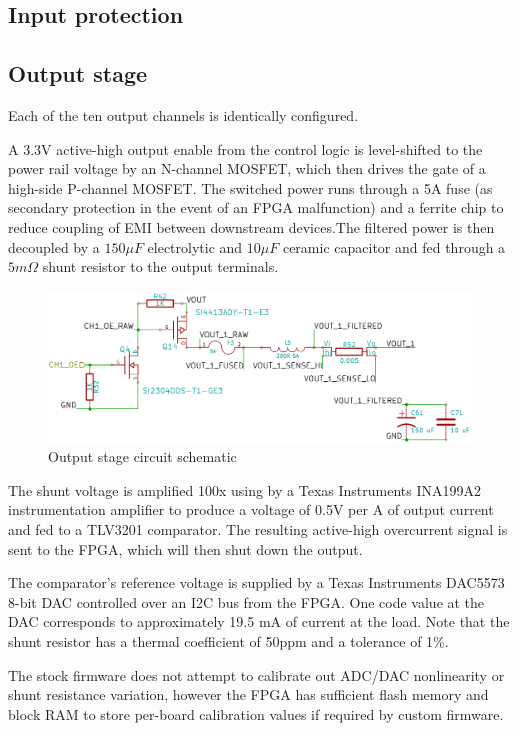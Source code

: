 \documentclass{article}
\begin{document}
\subsection{Input protection}

\subsection{Output stage}

Each of the ten output channels is identically configured.

A 3.3V active-high output enable from the control logic is level-shifted to the power rail voltage by an N-channel
MOSFET, which then drives the gate of a high-side P-channel MOSFET. The switched power runs through a 5A fuse (as 
secondary protection in the event of an FPGA malfunction) and a ferrite chip to reduce coupling of EMI between 
downstream devices.The filtered power is then decoupled by a $150 \mu F$ electrolytic and $10 \mu F$ ceramic 
capacitor and fed through a $5 m\Omega$ shunt resistor to the output terminals.

\begin{figure}[h!]
\includegraphics[scale=0.25]{output-stage-1.png}
\caption{Output stage circuit schematic}
\label{output-stage-1}
\end{figure}
\FloatBarrier

The shunt voltage is amplified 100x using by a Texas Instruments INA199A2 instrumentation amplifier to produce a 
voltage of 0.5V per A of output current and fed to a TLV3201 comparator. The resulting active-high overcurrent signal 
is sent to the FPGA, which will then shut down the output.

The comparator's reference voltage is supplied by a Texas Instruments DAC5573 8-bit DAC controlled over an I2C bus 
from the FPGA. One code value at the DAC corresponds to approximately 19.5 mA of current at the load. Note that the 
shunt resistor has a thermal coefficient of 50ppm and a tolerance of 1\%.

The stock firmware does not attempt to calibrate out ADC/DAC nonlinearity or shunt resistance variation, however the
FPGA has sufficient flash memory and block RAM to store per-board calibration values if required by custom firmware.
\end{document}
